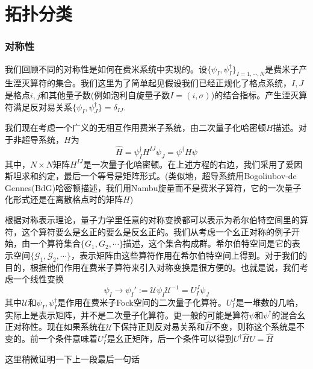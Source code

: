 \documentclass{article}
\numberwithin{equation}{subsection}
\begin{document}
\newpage
\part{拓扑分类}
\section{对称性}
我们回顾不同的对称性是如何在费米系统中实现的。设$\{\psi_{I},\psi_I^\dagger\}_{I=1,\cdots,N}$是费米子产生湮灭算符的集合。我们这里为了简单起见假设我们已经正规化了格点系统，$I,J$是格点$i,j$和其他量子数(例如泡利自旋量子数$I=(i,\sigma)$)的结合指标。产生湮灭算符满足反对易关系$\{\psi_I,\psi_J^\dagger\}=\delta_{IJ}$.

我们现在考虑一个广义的无相互作用费米子系统，由二次量子化哈密顿$H$描述。对于非超导系统，$H$为
\begin{equation}
    \hat{H}=\psi_I^\dagger H^{IJ}\psi_J=\psi^\dagger H\psi
\end{equation}
其中，$N\times N$矩阵$H^{IJ}$是一次量子化哈密顿。在上述方程的右边，我们采用了爱因斯坦求和约定，最后一个等号是矩阵形式。(类似地，超导系统用Bogoliubov-de Gennes(BdG)哈密顿描述，我们用Nambu旋量而不是费米子算符，它的一次量子化形式还是在离散格点时的矩阵$H$)

根据对称表示理论，量子力学里任意的对称变换都可以表示为希尔伯特空间里的算符，这个算符要么是幺正的要么是反幺正的。我们从考虑一个幺正对称的例子开始，由一个算符集合$\{G_1,G_2,\cdots\}$描述，这个集合构成群。希尔伯特空间是它的表示空间$\{\mathcal{G}_1,\mathcal{G}_2,\cdots\}$，表示矩阵由这些算符作用在希尔伯特空间上得到。对于我们的目的，根据他们作用在费米子算符来引入对称变换是很方便的。也就是说，我们考虑一个线性变换
\begin{equation}
    \psi_I\rightarrow\psi_I':=\mathcal{U}\psi_I\mathcal{U}^{-1}=U_{I}^{J}\psi_J
\end{equation}
其中$\mathcal{U}$和$\psi_I,\psi_I^\dagger$是作用在费米子Fock空间的二次量子化算符。$U_I^J$是一堆数的几哈，实际上是表示矩阵，并不是二次量子化算符。更一般的可能是算符$\psi$和$\psi^\dagger$的混合幺正对称性。现在如果系统在$\mathcal{U}$下保持正则反对易关系和$\hat{H}$不变，则称这个系统是不变的。前一个条件意味着$U_I^J$是幺正矩阵，后一个条件可以得到$U^\dagger \hat{H}U=\hat{H}$

这里稍微证明一下上一段最后一句话
\end{document}
